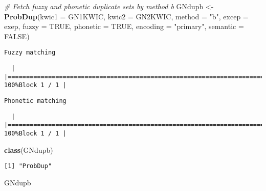\documentclass[
]{article}
\newenvironment{Shaded}{\begin{snugshade}}{\end{snugshade}}
\newcommand{\CommentTok}[1]{\textcolor[rgb]{0.56,0.35,0.01}{\textit{#1}}}
\newcommand{\DataTypeTok}[1]{\textcolor[rgb]{0.13,0.29,0.53}{#1}}
\newcommand{\KeywordTok}[1]{\textcolor[rgb]{0.13,0.29,0.53}{\textbf{#1}}}
\newcommand{\NormalTok}[1]{#1}
\newcommand{\OtherTok}[1]{\textcolor[rgb]{0.56,0.35,0.01}{#1}}
\newcommand{\StringTok}[1]{\textcolor[rgb]{0.31,0.60,0.02}{#1}}
\begin{document}
\begin{Shaded}
\begin{Highlighting}[]
\CommentTok{# Fetch fuzzy and phonetic duplicate sets by method b}
\NormalTok{GNdupb <-}\StringTok{ }\KeywordTok{ProbDup}\NormalTok{(}\DataTypeTok{kwic1 =}\NormalTok{ GN1KWIC, }\DataTypeTok{kwic2 =}\NormalTok{ GN2KWIC, }\DataTypeTok{method =} \StringTok{"b"}\NormalTok{,}
                  \DataTypeTok{excep =}\NormalTok{ exep, }\DataTypeTok{fuzzy =} \OtherTok{TRUE}\NormalTok{, }\DataTypeTok{phonetic =} \OtherTok{TRUE}\NormalTok{,}
                  \DataTypeTok{encoding =} \StringTok{"primary"}\NormalTok{, }\DataTypeTok{semantic =} \OtherTok{FALSE}\NormalTok{)}
\end{Highlighting}
\end{Shaded}

\begin{verbatim}
Fuzzy matching
\end{verbatim}

\begin{verbatim}
  |                                                                                                                       |===============================================================================================================| 100%Block 1 / 1 |
\end{verbatim}

\begin{verbatim}
Phonetic matching
\end{verbatim}

\begin{verbatim}
  |                                                                                                                       |===============================================================================================================| 100%Block 1 / 1 |
\end{verbatim}

\begin{Shaded}
\begin{Highlighting}[]
\KeywordTok{class}\NormalTok{(GNdupb)}
\end{Highlighting}
\end{Shaded}

\begin{verbatim}
[1] "ProbDup"
\end{verbatim}

\begin{Shaded}
\begin{Highlighting}[]
\NormalTok{GNdupb}
\end{Highlighting}
\end{Shaded}
\end{document}
